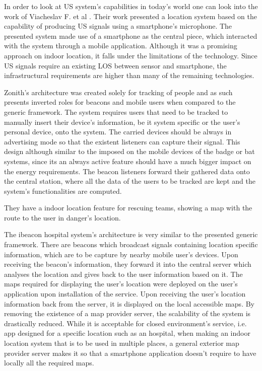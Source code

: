 \begin{description}
	In order to look at \ac{US} system's capabilities in today's world one can look into the work of Viacheslav F. et al \cite{us_ex}. Their work presented a location system based on the capability of producing \ac{US} signals using a smartphone's microphone. The presented system made use of a smartphone as the central piece, which interacted with the system through a mobile application. Although it was a promising approach on indoor location, it falls under the limitations of the technology. Since \ac{US} signals require an existing \ac{LOS} between sensor and smartphone, the infrastructural requirements are higher than many of the remaining technologies.

\end{description}



Zonith's architecture was created solely for tracking of people and as such presents inverted roles for beacons and mobile users when compared to the generic framework. The system requires users that need to be tracked to manually insert their device's information, be it system specific or the user's personal device, onto the system. The carried devices should be always in advertising mode so that the existent listeners can capture their signal. This design although similar to the imposed on the mobile devices of the badge or bat systems, since its an always active feature should have a much bigger impact on the energy requirements. The beacon listeners forward their gathered data onto the central station, where all the data of the users to be tracked are kept and the system's functionalities are computed. 

They have a indoor location feature for rescuing teams, showing a map with the route to the user in danger's location. 




The ibeacon hospital system's architecture is very similar to the presented generic framework. There are beacons which broadcast signals containing location specific information, which are to be capture by nearby mobile user's devices. Upon receiving the beacon's information, they forward it into the central server which analyses the location and gives back to the user information based on it. The maps required for displaying the user's location were deployed on the user's application upon installation of the service. Upon receiving the user's location information back from the server, it is displayed on the local accessible maps. By removing the existence of a map provider server, the scalability of the system is drastically reduced. While it is acceptable for closed environment's service, i.e. app designed for a specific location such as an hospital, when making an indoor location system that is to be used in multiple places, a general exterior map provider server makes it so that a smartphone application doesn't require to have locally all the required maps.